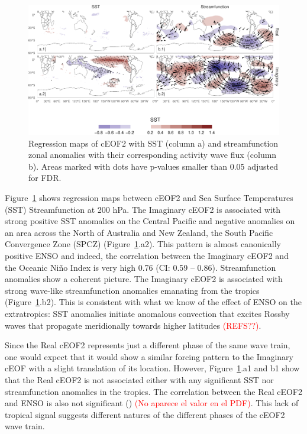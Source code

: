 \documentclass[smallextended]{svjour3}       %
\begin{document}
\begin{figure}
\includegraphics{../figures/sst-psi-2-1} \caption{Regression maps of cEOF2 with SST (column a) and streamfunction zonal anomalies with their corresponding activity wave flux (column b). Areas marked with dots have p-values smaller than 0.05 adjusted for FDR.}\label{fig:sst-psi-2}
\end{figure}

Figure~\ref{fig:sst-psi-2} shows regression maps between cEOF2 and Sea Surface Temperatures (SST) Streamfunction at 200 hPa. The Imaginary cEOF2 is associated with strong positive SST anomalies on the Central Pacific and negative anomalies on an area across the North of Australia and New Zealand, the South Pacific Convergence Zone (SPCZ) (Figure~\ref{fig:sst-psi-2}.a2). This pattern is almost canonically positive ENSO and indeed, the correlation between the Imaginary cEOF2 and the Oceanic Niño Index \citep{bamston1997} is very high 0.76 (CI: 0.59 -- 0.86). Streamfunction anomalies show a coherent picture. The Imaginary cEOF2 is associated with strong wave-like streamfunction anomalies emanating from the tropics (Figure~\ref{fig:sst-psi-2}.b2). This is consistent with what we know of the effect of ENSO on the extratropics: SST anomalies initiate anomalous convection that excites Rossby waves that propagate meridionally towards higher latitudes \textcolor{red}{(REFS??)}.

Since the Real cEOF2 represents just a different phase of the same wave train, one would expect that it would show a similar forcing pattern to the Imaginary cEOF with a slight translation of its location. However, Figure~\ref{fig:sst-psi-2}.a1 and b1 show that the Real cEOF2 is not associated either with any significant SST nor streamfunction anomalies in the tropics. The correlation between the Real cEOF2 and ENSO is also not significant () \textcolor{red}{(No aparece el valor en el PDF)}. This lack of tropical signal suggests different natures of the different phases of the cEOF2 wave train.
\end{document}
